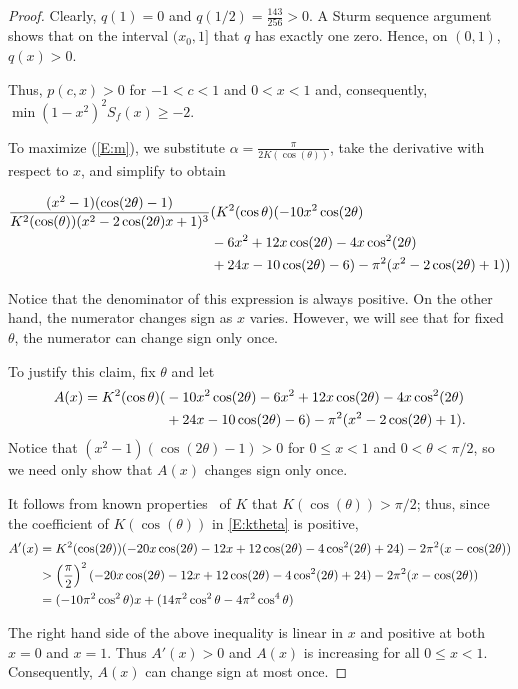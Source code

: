 \documentclass{lms}
\numberwithin{equation}{section}
\begin{document}
\begin{proof}
Clearly, $q(1) = 0$ and $q(1/2)=\frac{143}{256} > 0$.  A Sturm sequence argument shows that on 
the interval $(x_0,1]$ that $q$ has exactly one zero.  Hence, on $(0,1)$, $q(x) > 0$.

Thus, $p(c,x) > 0$ for 
$-1 < c < 1$ and $0 < x < 1$ and, consequently, $\min (1-x^2)^2 {S_f(x)} \ge -2$.

To maximize (\ref{E:m}), we substitute $\alpha=\frac{\pi}{2 K(\cos(\theta))}$,
take the derivative with respect to $x$, and simplify to obtain

\begin{align}
\frac{(x^2-1)(\cos(2\theta) -1)}
{K^2(\cos(\theta))(x^2-2\cos(2\theta)x+1)^3}
&(K^2(\cos\theta)(-10x^2 \cos(2\theta) \\\notag
&-6x^2 
+12x\cos(2\theta)-4x\cos^2(2\theta)\\\notag
&+24x-10\cos(2\theta)-6) -\pi^2(x^2-2\cos(2\theta)+1))
\end{align}


Notice that the denominator of this expression is always positive.
On the other hand, the numerator changes sign as $x$ varies.  However,
we will see that for fixed $\theta$, the numerator can change sign
only once.

To justify this claim, fix $\theta$ and let 
\begin{align} \notag
A(x)=K^2(\cos\theta)(&-10x^2 \cos(2\theta) -6x^2 
+12x\cos(2\theta)-4x\cos^2(2\theta)\\\notag
& +24x-10\cos(2\theta)-6)
-\pi^2(x^2-2\cos(2\theta)+1).
\end{align}
Notice that $(x^2-1)(\cos(2\theta)-1)>0$ for $0\leq x<1$ and
$0<\theta<\pi/2$, so we need
only show that $A(x)$ changes sign only once.

It follows from known properties~\cite{AVV97} of $K$ that 
$K(\cos(\theta))>\pi/2$; thus, since the coefficient of $K(\cos(\theta))$
in \eqref{E:ktheta} is positive,
\begin{align}\label{E:ktheta}
A'(x) & = K^2(\cos(2\theta))(-20x\cos(2\theta) -12x+12\cos(2\theta) - 4\cos^2(2\theta) + 24) - 2\pi^2(x-\cos(2\theta))\\\notag
&>\left(\frac{\pi}{2}\right)^2(-20x\cos(2\theta) 
-12x+12\cos(2\theta) - 4\cos^2(2\theta) + 24) - 2\pi^2(x-\cos(2\theta))\\\notag
&= (-10\pi^2\cos^2\theta)x + (14\pi^2\cos^2\theta-4\pi^2\cos^4\theta )
\end{align}


The right hand side of the above inequality is linear in $x$ and positive
at both $x=0$ and $x=1$.  Thus $A'(x)>0$  and
$A(x)$ is increasing for all $0\leq x <1$.  Consequently, $A(x)$
can change sign at most once.


\end{proof}
\end{document}
